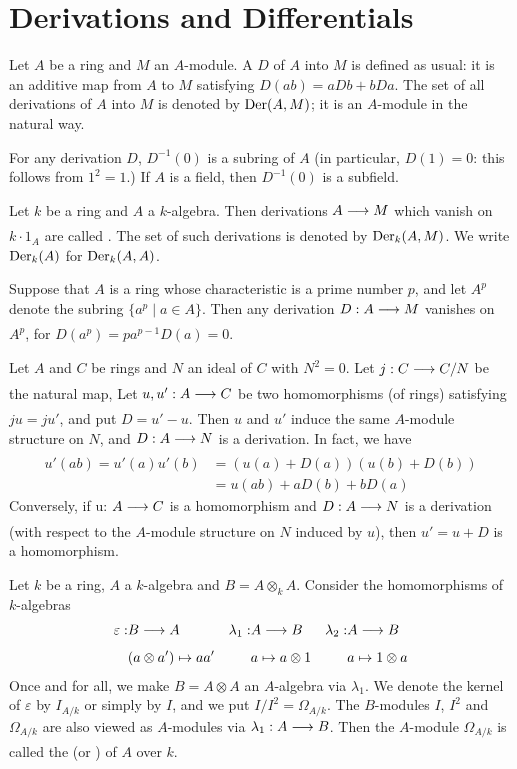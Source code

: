 \documentclass[../main]{subfiles}
\begin{document}
\section{Derivations and Differentials}\label{sec:26}

\newparagraph Let $A$ be a ring and $M$ an $A$-module. A  $D$ of $A$ into $M$ is defined as usual: it is an additive map from $A$ to $M$ satisfying \newline $D(a b)=a D b+b D a$. The set of all derivations of $A$ into $M$ is denoted by $\operatorname{Der}(A, M)$; it is an $A$-module in the natural way.

For any derivation $D$, $D^{-1}(0)$ is a subring of $A$ (in particular, $D(1)=0$: this follows from $1^2=1$.) If $A$ is a field, then $D^{-1}(0)$ is a subfield. 

Let $k$ be a ring and $A$ a $k$-algebra. Then derivations $A \varrightarrow{} M$ which vanish on $k\cdot1_A$ are called . The set of such derivations is denoted by $\operatorname{Der}_k(A, M)$. We write $\operatorname{Der}_k(A)$ for $\operatorname{Der}_k(A, A)$.

Suppose that $A$ is a ring whose characteristic is a prime number $p$, and let $A^p$ denote the subring $\{a^p \mid a \in A\}$. Then any derivation $D:A \varrightarrow{} M$ vanishes on $A^p$, for $D(a^p)=pa^{p-1} D(a) =0$.

\newparagraph Let $A$ and $C$ be rings and $N$ an ideal of $C$ with $N^2=0$. Let \newline $j: C \varrightarrow{} C / N$ be the natural map, Let $u, u': A \varrightarrow{} C$ be two homomorphisms (of rings) satisfying $ju =j u'$, and put $D= u'-u$. Then $u$ and $u'$ induce the same $A$-module structure on $N$, and $D: A \varrightarrow{} N$ is a derivation. In fact, we have
\[
\begin{aligned}
u'(a b)=u'(a) u'(b) &=(u(a)+D(a))(u(b)+D(b)) \\
&=u(a b)+a D(b)+b D(a)
\end{aligned}
\]
Conversely, if u: $A \varrightarrow{} C$ is a homomorphism and $D: A \varrightarrow{} N$ is a derivation (with respect to the $A$-module structure on $N$ induced by $u$), then $u'=u+D$ is a homomorphism.

\newparagraph Let $k$ be a ring, $A$ a $k$-algebra and $B=A \otimes_k A$. Consider the homomorphisms of $k$-algebras
\[\begin{aligned}
\varepsilon:& B \varrightarrow{} A & \lambda_1:& A \varrightarrow{} B & \lambda_2:&A\varrightarrow{}B\\
&(a\otimes a') \mapsto aa' & &a\mapsto a\otimes 1 & & a \mapsto 1 \otimes a 
\end{aligned}\]
Once and for all, we make $B=A \otimes A$ an $A$-algebra via $\lambda_1$. We denote the kernel of $\varepsilon$ by $I_{A / k}$ or simply by $I$, and we put $I / I^2=\Omega_{A / k}$. The $B$-modules $I$, $I^2$ and $\Omega_{A/k}$ are also viewed as $A$-modules via $\lambda_1: A \varrightarrow{} B$. Then the $A$-module $\Omega_{A/k}$ is called the  (or ) of $A$ over $k$.
\end{document}
